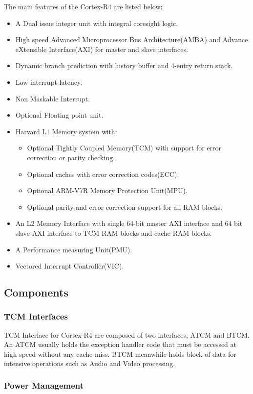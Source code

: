 The main features of the Cortex-R4 are listed below:
\begin{itemize}
 \item A Dual issue integer unit with integral coresight logic.
 \item High speed Advanced Microprocessor Bus Architecture(AMBA) and Advance eXtensible Interface(AXI) for master and slave interfaces.
 \item Dynamic branch prediction with history buffer and 4-entry return stack.
 \item Low interrupt latency.
 \item Non Maskable Interrupt.
 \item Optional Floating point unit.
 \item Harvard L1 Memory system with:
 \begin{itemize}{}{}
 	\item Optional Tightly Coupled Memory(TCM) with support for error correction or parity checking.
 	\item Optional caches with error correction codes(ECC).
 	\item Optional ARM-V7R Memory Protection Unit(MPU).
 	\item Optional parity and error correction support for all RAM blocks.
 \end{itemize}
 \item An L2 Memory Interface with single 64-bit master AXI interface and 64 bit slave AXI interface to TCM RAM blocks and cache RAM blocks.
 \item A Performance measuring Unit(PMU).
 \item Vectored Interrupt Controller(VIC).
\end{itemize}

\subsection{Components}

\subsubsection{\textbf{TCM Interfaces}}

TCM Interface for Cortex-R4 are composed of two interfaces, ATCM and BTCM.
An ATCM usually holds the exception handler code that must be accessed at high speed without any cache miss.
BTCM meanwhile holds block of data for intensive operations such as Audio and Video processing.


\subsubsection{\textbf{Power Management}}

